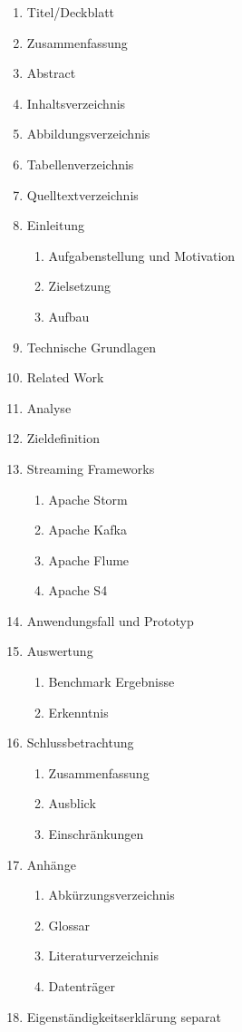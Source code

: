 \documentclass[11pt, a4paper]{book}
\begin{document}
\begin{enumerate}
\item Titel/Deckblatt

\item Zusammenfassung
\item Abstract

\item Inhaltsverzeichnis
\item Abbildungsverzeichnis
\item Tabellenverzeichnis
\item Quelltextverzeichnis

\item Einleitung
	\begin{enumerate}
		\item Aufgabenstellung und Motivation
		\item Zielsetzung
		\item Aufbau
	\end{enumerate}

\item Technische Grundlagen

\item Related Work

\item Analyse
	
\item Zieldefinition

\item Streaming Frameworks
  \begin{enumerate}
		\item Apache Storm
		\item Apache Kafka
		\item Apache Flume
		\item Apache S4
	\end{enumerate}


\item Anwendungsfall und Prototyp

\item Auswertung
	\begin{enumerate}
		\item Benchmark Ergebnisse
		\item Erkenntnis
	\end{enumerate}

\item Schlussbetrachtung
	\begin{enumerate}
		\item Zusammenfassung
		\item Ausblick
		\item Einschränkungen
	\end{enumerate}

\item Anhänge
	\begin{enumerate}
		\item Abkürzungsverzeichnis
		\item Glossar
		\item Literaturverzeichnis
		\item Datenträger
	\end{enumerate}
\item Eigenständigkeitserklärung separat
\end{enumerate}
\end{document}
